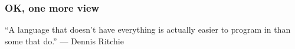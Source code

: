 \documentclass[handout,compress,t,11pt]{beamer}
\begin{document}
\begin{frame}
    \frametitle{OK, one more view}
    {\large{} ``A language that doesn't have everything is actually easier to 
    program in than some that do.'' --- Dennis Ritchie \\}
    \vspace{8\baselineskip}    
\end{frame}

%

\end{document}
